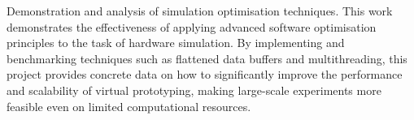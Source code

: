 Demonstration and analysis of simulation optimisation techniques. 
This work demonstrates the effectiveness of applying advanced software optimisation principles to the task of hardware simulation. 
By implementing and benchmarking techniques such as flattened data buffers and multithreading, this project provides concrete data 
on how to significantly improve the performance and scalability of virtual prototyping, making large-scale experiments more feasible even on limited computational resources.

